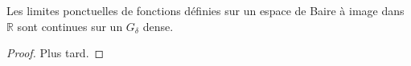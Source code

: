 \begin{thm}
  Les limites ponctuelles de fonctions définies sur un
  espace de Baire à image dans $\mathbb{R}$ sont
  continues sur un $G_\delta$ dense.
\end{thm}

\begin{proof}
  Plus tard.
\end{proof}


